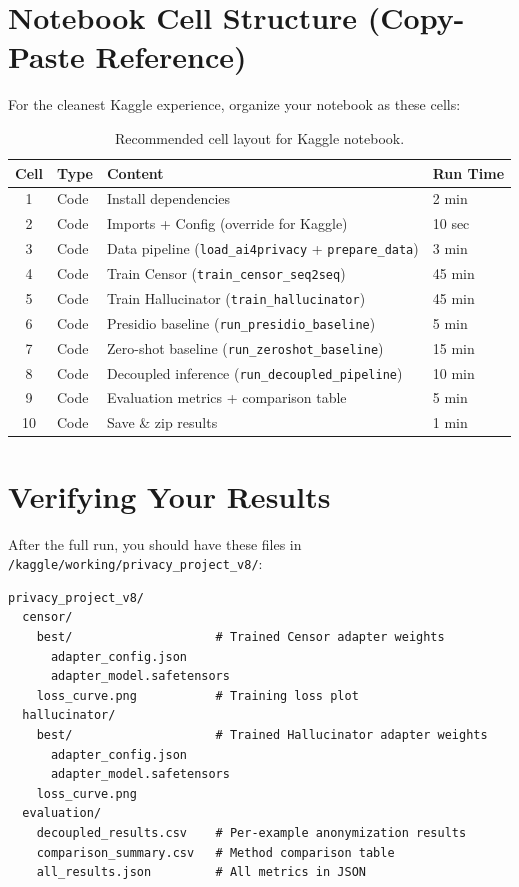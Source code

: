 \documentclass[11pt, a4paper]{article}
\begin{document}
\section{Notebook Cell Structure (Copy-Paste Reference)}

For the cleanest Kaggle experience, organize your notebook as these cells:

\begin{table}[h]
\centering
\small
\begin{tabular}{clll}
\toprule
\textbf{Cell} & \textbf{Type} & \textbf{Content} & \textbf{Run Time} \\
\midrule
1 & Code & Install dependencies & 2 min \\
2 & Code & Imports + Config (override for Kaggle) & 10 sec \\
3 & Code & Data pipeline (\texttt{load\_ai4privacy} + \texttt{prepare\_data}) & 3 min \\
4 & Code & Train Censor (\texttt{train\_censor\_seq2seq}) & 45 min \\
5 & Code & Train Hallucinator (\texttt{train\_hallucinator}) & 45 min \\
6 & Code & Presidio baseline (\texttt{run\_presidio\_baseline}) & 5 min \\
7 & Code & Zero-shot baseline (\texttt{run\_zeroshot\_baseline}) & 15 min \\
8 & Code & Decoupled inference (\texttt{run\_decoupled\_pipeline}) & 10 min \\
9 & Code & Evaluation metrics + comparison table & 5 min \\
10 & Code & Save \& zip results & 1 min \\
\bottomrule
\end{tabular}
\caption{Recommended cell layout for Kaggle notebook.}
\end{table}

\section{Verifying Your Results}

After the full run, you should have these files in \texttt{/kaggle/working/privacy\_project\_v8/}:

\begin{lstlisting}[style=bash]
privacy_project_v8/
  censor/
    best/                    # Trained Censor adapter weights
      adapter_config.json
      adapter_model.safetensors
    loss_curve.png           # Training loss plot
  hallucinator/
    best/                    # Trained Hallucinator adapter weights
      adapter_config.json
      adapter_model.safetensors
    loss_curve.png
  evaluation/
    decoupled_results.csv    # Per-example anonymization results
    comparison_summary.csv   # Method comparison table
    all_results.json         # All metrics in JSON
\end{lstlisting}
\end{document}
